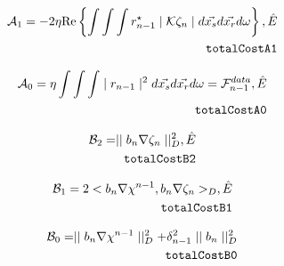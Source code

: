 \documentclass[10pt,a4paper]{article}
\newcommand{\real}[1]{\text{Re} \left\{ #1 \right\}}
\begin{document}
\begin{align} \label{eq:totalCostA1} \mathcal{A}_1 = -2 \eta \real{\int
\int \int r^{\star}_{n-1} \mid \mathcal{K} \zeta_n \mid
d\vec{x_s}d\vec{x_r}d\omega} , \hat{E}\\
\tag*{\texttt{totalCostA1}}
\end{align}

\begin{align} \label{eq:totalCostA0} \mathcal{A}_0 = \eta \int \int \int
\mid r_{n-1} \mid^2 d\vec{x_s}d\vec{x_r}d\omega =
\mathcal{F}^{data}_{n-1} , \hat{E}\\
\tag*{\texttt{totalCostA0}}
 \end{align}

\begin{align} \label{eq:totalCostB2} \mathcal{B}_2 = \mid \mid b_n \nabla
\zeta_n \mid \mid^{2}_D , \hat{E}\\
\tag*{\texttt{totalCostB2}}
\end{align}

\begin{align} \label{eq:totalCostB1} \mathcal{B}_1 = 2 < b_n
\nabla\chi^{n-1}, b_n \nabla \zeta_n >_D, \hat{E}\\
\tag*{\texttt{totalCostB1}}
\end{align}

\begin{align} \label{eq:totalCostB0} \mathcal{B}_0 = \mid \mid b_n \nabla
\chi^{n-1} \mid \mid^{2}_D + \delta^{2}_{n-1} \mid \mid b_n \mid
\mid^{2}_D\\
\tag*{\texttt{totalCostB0}}
\end{align}
\end{document}
